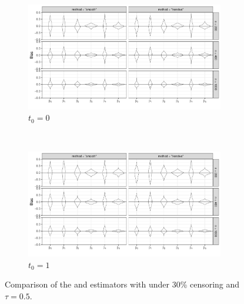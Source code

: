 \begin{figure}[ht]
  \centering
  \begin{subfigure}[b]{1.0\textwidth}
    \includegraphics[width = 0.95\textwidth]{vplot_pmb_t0_c3_Q50}
    \caption{$t_0 = 0$}
    \label{fig:sim2t0}
  \end{subfigure}
 \\[3ex]
  \begin{subfigure}[b]{1\textwidth}  
    \includegraphics[width = 0.95\textwidth]{vplot_pmb_t1_c3_Q50}
    \caption{$t_0 = 1$}
    \label{fig:sim2t1}
  \end{subfigure}
  \caption{\label{fig:sim2}
  Comparison of the  and  estimators with 
    under 30\% censoring and $\tau = 0.5$.}
\end{figure}



